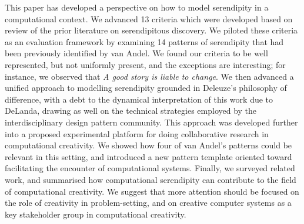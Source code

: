This paper has developed a perspective on how to model serendipity in
a computational context.  We advanced 13 criteria which were developed
based on review of the prior literature on serendipitous discovery.
We piloted these criteria as an evaluation framework by examining 14
patterns of serendipity that had been previously identified by van
Andel.  We found our criteria to be well represented, but not
uniformly present, and the exceptions are interesting; for instance,
we observed that \emph{A good story is liable to change}.  We then
advanced a unified approach to modelling serendipity grounded in
Deleuze's philosophy of difference, with a debt to the dynamical
interpretation of this work due to DeLanda, drawing as well on the
technical strategies employed by the interdisciplinary design pattern
community.  This approach was developed further into a proposed
experimental platform for doing collaborative research in
computational creativity.  We showed how four of van Andel's patterns
could be relevant in this setting, and introduced a new pattern
template oriented toward facilitating the encounter of computational
systems.
%
Finally, we surveyed related work, and summarised how computational
serendipity can contribute to the field of computational creativity.
We suggest that more attention should be focused on the role of
creativity in problem-setting, and on creative computer systems as a
key stakeholder group in computational creativity.  
